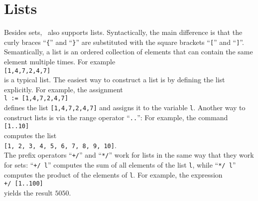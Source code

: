 \section{Lists}
Besides sets, \setlx\ also supports lists.  Syntactically, the main difference is that the
curly braces ``\texttt{\{}'' and ``\texttt{\}}'' are substituted with the square brackets
``\texttt{[}'' and ``\texttt{]}''.  Semantically, a list is an ordered collection of elements that 
can contain the same element multiple times.  For example
\\[0.2cm]
\hspace*{1.3cm}
\texttt{[1,4,7,2,4,7]}
\\[0.2cm]
is a typical list.  The easiest way to construct a list is by defining the list explicitly. For
example, the assignment
\\[0.2cm]
\hspace*{1.3cm}
\texttt{l := [1,4,7,2,4,7]}
\\[0.2cm]
defines the list \texttt{[1,4,7,2,4,7]} and assigns it to the variable \texttt{l}.
Another way to construct lists is via the range operator ``\texttt{..}'':
For example, the command
\\[0.2cm]
\hspace*{1.3cm}
\texttt{[1..10]}
\\[0.2cm]
computes the list
\\[0.2cm]
\hspace*{1.3cm}
\texttt{[1, 2, 3, 4, 5, 6, 7, 8, 9, 10]}.
\\[0.2cm]
The prefix operators ``\texttt{+/}'' and ``\texttt{*/}'' work for lists in the same way that they
work for sets: ``\texttt{+/ l}'' computes the sum of all elements of the list \texttt{l}, while
``\texttt{*/ l}'' computes the product of the elements of \texttt{l}.  For example, the expression
\\[0.2cm]
\hspace*{1.3cm}
\texttt{+/ [1..100]}
\\[0.2cm]
yields the result $5050$.

